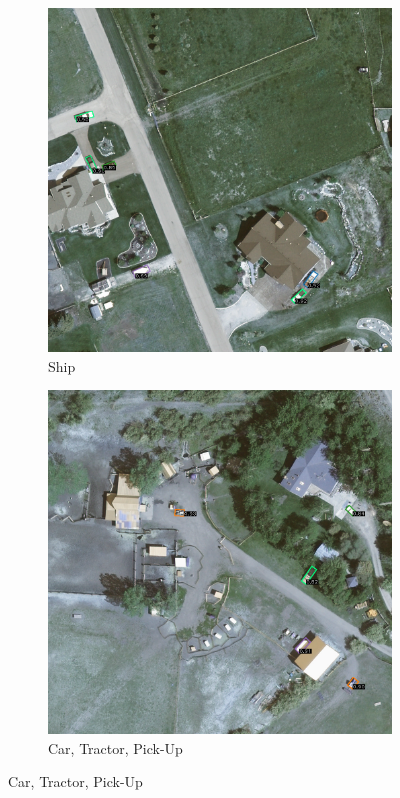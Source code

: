 \begin{figure}[h!]
    \begin{subfigure}[t]{0.38\textwidth}
        \centering
        \includegraphics[width=\linewidth]{images/015Results/02perm_exp/comp_images/rgb/509.png}
        \caption{Ship}
    \end{subfigure}
    \begin{subfigure}[t]{0.38\textwidth}
        \centering
        \includegraphics[width=\linewidth]{images/015Results/02perm_exp/comp_images/rgb/523.png}
        \caption{Car, Tractor, Pick-Up}
    \end{subfigure}
    

\end{figure}
